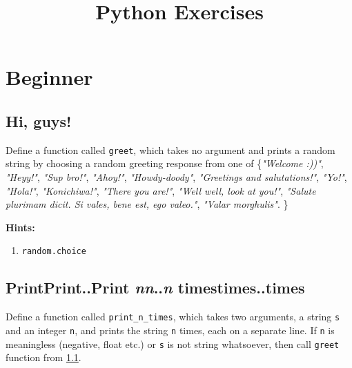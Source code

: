 \documentclass[a4paper]{article}
\title{Python Exercises}
\date{}
\begin{document}
\maketitle
\tableofcontents
\newpage

\section{Beginner}

\subsection{Hi, guys!} \label{hi}

Define a function called \texttt{greet}, which takes no argument and prints a random string by choosing a random greeting response from one of \{\textit{"Welcome :))"}, \textit{"Heyy!"}, \textit{"Sup bro!"}, \textit{"Ahoy!"}, \textit{"Howdy-doody"}, \textit{"Greetings and salutations!"}, \textit{"Yo!"}, \textit{"Hola!"}, \textit{"Konichiwa!"}, \textit{"There you are!"}, \textit{"Well well, look at you!"}, \textit{"Salute plurimam dicit. Si vales, bene est, ego valeo."}, \textit{"Valar morghulis"}. \}

\textbf{Hints:}
\begin{enumerate}
    \item \texttt{random.choice}
\end{enumerate}

\subsection{PrintPrint..Print \textit{n}\textit{n}..\textit{n} timestimes..times}

Define a function called \texttt{print\_n\_times}, which takes two arguments, a string \verb|s| and an integer \verb|n|, and prints the string \verb|n| times, each on a separate line. If \texttt{n} is meaningless (negative, float etc.) or \texttt{s} is not string whatsoever, then call \texttt{greet} function from \ref{hi}.
\end{document}
